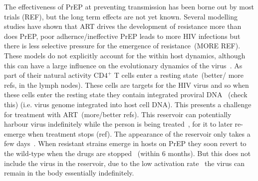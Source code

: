 \documentclass[DIV=15]{scrartcl}
\begin{document}
 The effectiveness of PrEP at preventing transmission has been borne out by most trials  (REF), but the long term effects are not yet known. Several  modelling studies have shown that  ART drives the development of resistance more than does PrEP, poor adhernce/ineffective PrEP leads to more HIV infections but there is less  selective pressure for the emergence of  resistance~\cite{abbas2013}(MORE REF). These models do not explicitly account for the within host dynamics, although this can have a large influence on the evolutionary dynamics of the virus~\cite{lythgoe2013}.    As part of their natural activity CD$4^+$ T  cells enter a resting state~\cite{bukrinsky1991}(better/ more refs, in the lymph nodes). These cells are targets for the HIV virus and so when these cells enter the resting state they contain integrated  proviral  DNA~ \cite{chun1997,finzi1997}(check this) (i.e. virus genome integrated into host cell DNA).  This presents a challenge for treatment with ART~\cite{chun2015}(more/better refs). 
This reservoir can potentially harbour virus indefinitely while the person is being treated~\cite{siliciano2003,crooks2015}, for  it to later re-emerge when treatment stops (ref). The appearance of the reservoir   only takes a few days~\cite{sompayrac2011}. %
When resistant strains emerge in hosts on PrEP they soon revert to the wild-type  when the drugs are stopped~\cite{weis2016} (within 6 months). But this  does not include the virus in the reservoir, due to the  low activation rate~\cite{finzi1999} the virus can remain in the body essentially indefinitely.





\end{document}

